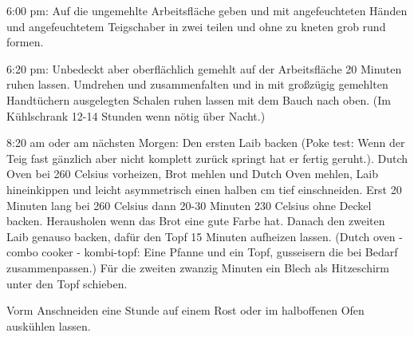 { 6:00 pm: Auf die ungemehlte Arbeitsfläche geben und mit angefeuchteten Händen und angefeuchtetem Teigschaber in zwei teilen und ohne zu kneten grob rund formen.

 6:20 pm: Unbedeckt aber oberflächlich gemehlt auf der Arbeitsfläche 20 Minuten ruhen lassen. Umdrehen und zusammenfalten und in mit großzügig gemehlten Handtüchern ausgelegten Schalen ruhen lassen mit dem Bauch nach oben. (Im Kühlschrank 12-14 Stunden wenn nötig über Nacht.)

 8:20 am oder am nächsten Morgen: Den ersten Laib backen (Poke test: Wenn der Teig fast gänzlich aber nicht komplett zurück springt hat er fertig geruht.). Dutch Oven bei 260 Celsius vorheizen, Brot mehlen und Dutch Oven mehlen, Laib hineinkippen und leicht asymmetrisch einen halben cm tief einschneiden. Erst 20 Minuten lang bei 260 Celsius dann 20-30 Minuten 230 Celsius ohne Deckel backen. Herausholen wenn das Brot eine gute Farbe hat. Danach den zweiten Laib genauso backen, dafür den Topf 15 Minuten aufheizen lassen. (Dutch oven - combo cooker - kombi-topf: Eine Pfanne
 und ein Topf, gusseisern die bei Bedarf zusammenpassen.)
Für die zweiten zwanzig Minuten ein Blech als Hitzeschirm unter den Topf schieben.

Vorm Anschneiden eine Stunde auf einem Rost oder im halboffenen Ofen auskühlen lassen. }


